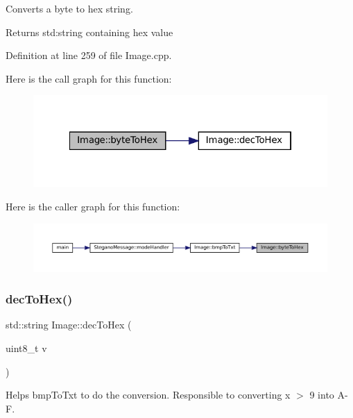 Converts a byte to hex string. 

\begin{DoxyReturn}{Returns}
std\+:string containing hex value 
\end{DoxyReturn}


Definition at line 259 of file Image.\+cpp.

Here is the call graph for this function\+:\nopagebreak
\begin{figure}[H]
\begin{center}
\leavevmode
\includegraphics[width=322pt]{classImage_ac1c14eba8a20f8bb71c3c21eaba90ecb_cgraph}
\end{center}
\end{figure}
Here is the caller graph for this function\+:\nopagebreak
\begin{figure}[H]
\begin{center}
\leavevmode
\includegraphics[width=350pt]{classImage_ac1c14eba8a20f8bb71c3c21eaba90ecb_icgraph}
\end{center}
\end{figure}
\mbox{\label{classImage_a26f7e0b2649e2529df7e7aea46f2da4a}} 
\subsubsection{\texorpdfstring{decToHex()}{decToHex()}}
{\footnotesize\ttfamily std\+::string Image\+::dec\+To\+Hex (\begin{DoxyParamCaption}\item[{uint8\+\_\+t}]{v }\end{DoxyParamCaption})\hspace{0.3cm}{\ttfamily [static]}}



Helps bmp\+To\+Txt to do the conversion. Responsible to converting x $>$ 9 into A-\/F. 

